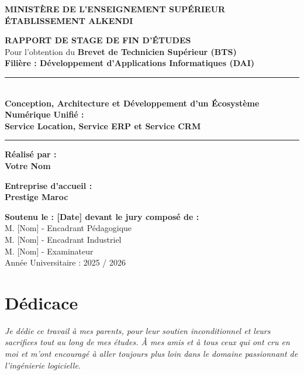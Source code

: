 \documentclass[12pt, a4paper]{report}
\begin{document}

\begin{titlepage}
    \begin{center}
        \vspace*{1cm}
        \Large \textbf{MINISTÈRE DE L'ENSEIGNEMENT SUPÉRIEUR} \\
        \textbf{ÉTABLISSEMENT ALKENDI}
        
        \vspace{1.5cm}
        \Large \textbf{RAPPORT DE STAGE DE FIN D'ÉTUDES} \\
        \large Pour l'obtention du \textbf{Brevet de Technicien Supérieur (BTS)} \\
        \large \textbf{Filière : Développement d'Applications Informatiques (DAI)}
        
        \vspace{1.5cm}
        \rule{\linewidth}{0.6mm} \\[0.4cm]
        \Huge \textbf{Conception, Architecture et Développement d'un Écosystème Numérique Unifié :} \\
        \huge \textbf{Service Location, Service ERP et Service CRM} \\[0.4cm]
        \rule{\linewidth}{0.6mm}
        
        \vspace{1.5cm}
        \Large \textbf{Réalisé par :} \\ \textbf{Votre Nom}
        
        \vspace{1cm}
        \textbf{Entreprise d'accueil :} \\ \textbf{Prestige Maroc}
        
        \vfill
        \normalsize \textbf{Soutenu le : [Date] devant le jury composé de :} \\
        M. [Nom] - Encadrant Pédagogique \\
        M. [Nom] - Encadrant Industriel \\
        M. [Nom] - Examinateur \\
        \vspace{1cm} Année Universitaire : 2025 / 2026
    \end{center}
\end{titlepage}


\chapter*{Dédicace}
\textit{Je dédie ce travail à mes parents, pour leur soutien inconditionnel et leurs sacrifices tout au long de mes études. À mes amis et à tous ceux qui ont cru en moi et m'ont encouragé à aller toujours plus loin dans le domaine passionnant de l'ingénierie logicielle.}
\end{document}

